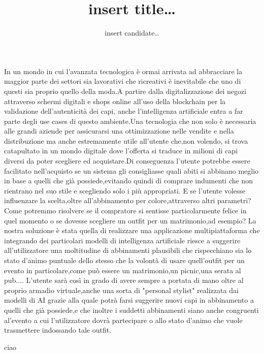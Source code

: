 \documentclass[a4paper,oneside]{Tptesi2}
\title{insert title\ldots}
\author{insert candidate\ldots}
\begin{document}
\frontmatter

%
\pagestyle{headings} %
%
\maketitle %
%
%
\tableofcontents %
\cleardoublepage
%
%

{}
%
\frontmatter

In un mondo in cui l'avanzata tecnologica è ormai arrivata ad abbracciare la maggior parte dei settori sia lavorativi che ricreativi è inevitabile che uno di questi sia proprio quello della moda.A partire dalla digitalizzazione dei negozi attraverso schermi digitali e shops online all'uso della blockchain per la validazione dell'autenticità dei capi, anche l'intelligenza artificiale entra a far parte degli use cases di questo ambiente.Una tecnologia che non solo è necessaria alle grandi aziende per assicurarsi una ottimizzazione nelle vendite e nella distribuzione ma anche estremamente utile all'utente che,non volendo, si trova catapultato in un mondo digitale dove l'offerta si traduce in milioni di capi diversi da poter scegliere ed acquistare.Di conseguenza l'utente potrebbe essere facilitato nell'acquisto se un sistema gli consigliasse quali abiti si abbinano meglio in base a quelli che già possiede,evitando quindi di comprare indumenti che non rientrano nel suo stile e scegliendo solo i più appropriati.
E se l'utente volesse influenzare la scelta,oltre all'abbinamento per colore,attraverso altri parametri?Come potremmo risolvere se il compratore si sentisse particolarmente felice in quel momento o se dovesse scegliere un outfit per un matrimonio,ad esempio?
La nostra soluzione è stata quella di realizzare una applicazione multipiattaforma che integrando dei particolari modelli di intelligenza artificiale riesce a suggerire all'utilizzatore una moltitudine di abbinamenti plausibili che rispecchiano sia lo stato d'animo puntuale dello stesso che la volontà di usare quell'outfit per un evento in particolare,come può essere un matrimonio,un picnic,una serata al pub....
L'utente sarà così in grado di avere sempre a portata di mano oltre al proprio armadio virtuale,anche una sorta di "personal stylist" realizzata dai modelli di AI grazie alla quale potrà farsi suggerire nuovi capi in abbinamento a quelli che già possiede,e che inoltre i suddetti abbinamenti siano anche congruenti al'evento a cui l'utilizzatore dovrà partecipare o allo stato d'animo che vuole trasmettere indossando tale outfit.

\mainmatter

ciao
% 





%
\end{document}
